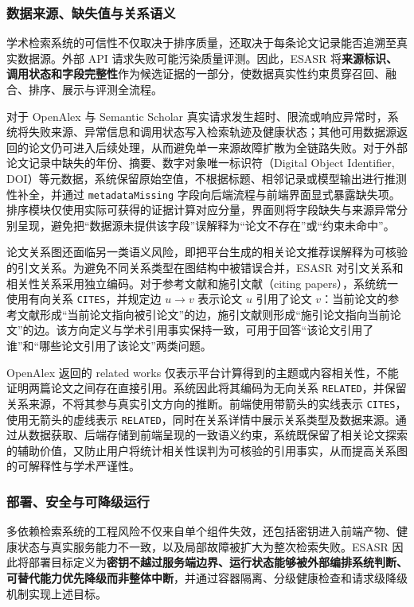 \documentclass[a4paper,12pt,fontset=none]{ctexart}
\begin{document}
\subsubsection{数据来源、缺失值与关系语义}

学术检索系统的可信性不仅取决于排序质量，还取决于每条论文记录能否追溯至真实数据源。外部 API 请求失败可能污染质量评测。因此，ESASR 将\textbf{来源标识、调用状态和字段完整性}作为候选证据的一部分，使数据真实性约束贯穿召回、融合、排序、展示与评测全流程。

对于 OpenAlex 与 Semantic Scholar 真实请求发生超时、限流或响应异常时，系统将失败来源、异常信息和调用状态写入检索轨迹及健康状态；其他可用数据源返回的论文仍可进入后续处理，从而避免单一来源故障扩散为全链路失败。对于外部论文记录中缺失的年份、摘要、数字对象唯一标识符（Digital Object Identifier, DOI）等元数据，系统保留原始空值，不根据标题、相邻记录或模型输出进行推测性补全，并通过 \texttt{metadataMissing} 字段向后端流程与前端界面显式暴露缺失项。排序模块仅使用实际可获得的证据计算对应分量，界面则将字段缺失与来源异常分别呈现，避免把“数据源未提供该字段”误解释为“论文不存在”或“约束未命中”。

论文关系图还面临另一类语义风险，即把平台生成的相关论文推荐误解释为可核验的引文关系。为避免不同关系类型在图结构中被错误合并，ESASR 对引文关系和相关性关系采用独立编码。对于参考文献和施引文献（citing papers），系统统一使用有向关系 \texttt{CITES}，并规定边 $u\rightarrow v$ 表示论文 $u$ 引用了论文 $v$：当前论文的参考文献形成“当前论文指向被引论文”的边，施引文献则形成“施引论文指向当前论文”的边。该方向定义与学术引用事实保持一致，可用于回答“该论文引用了谁”和“哪些论文引用了该论文”两类问题。

OpenAlex 返回的 related works 仅表示平台计算得到的主题或内容相关性，不能证明两篇论文之间存在直接引用。系统因此将其编码为无向关系 \texttt{RELATED}，并保留关系来源，不将其参与真实引文方向的推断。前端使用带箭头的实线表示 \texttt{CITES}，使用无箭头的虚线表示 \texttt{RELATED}，同时在关系详情中展示关系类型及数据来源。通过从数据获取、后端存储到前端呈现的一致语义约束，系统既保留了相关论文探索的辅助价值，又防止用户将统计相关性误判为可核验的引用事实，从而提高关系图的可解释性与学术严谨性。

\subsubsection{部署、安全与可降级运行}

多依赖检索系统的工程风险不仅来自单个组件失效，还包括密钥进入前端产物、健康状态与真实服务能力不一致，以及局部故障被扩大为整次检索失败。ESASR 因此将部署目标定义为\textbf{密钥不越过服务端边界、运行状态能够被外部编排系统判断、可替代能力优先降级而非整体中断}，并通过容器隔离、分级健康检查和请求级降级机制实现上述目标。
\end{document}
